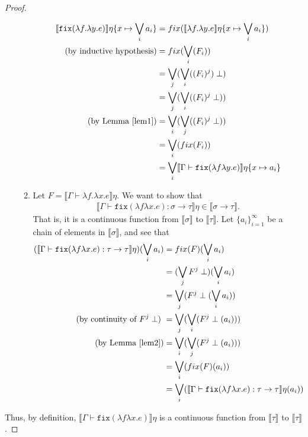\begin{proof}
\begin{itemize}
\begin{enumerate}
\begin{align*}
 \llbracket \texttt{fix} (\lambda f.\lambda y.e)\rrbracket\eta\{x\mapsto \bigvee_i a_i\} &= 
 fix(\llbracket \lambda f. \lambda y.e \rrbracket\eta\{x\mapsto \bigvee_i a_i\})\\
 \text{(by inductive hypothesis)} &= fix(\bigvee_i(F_i)) \\
 &= \bigvee_j(\bigvee_i((F_i)^j )\perp) \\
 &= \bigvee_j(\bigvee_i((F_i)^j \perp)) \\ 
\text{(by Lemma \ref{lem1})} &= \bigvee_i(\bigvee_j((F_i)^j \perp)) \\ 
&= \bigvee_i(fix(F_i))\\
&= \bigvee_i \llbracket \Gamma \vdash \texttt{fix}(\lambda f \lambda y.e)\rrbracket\eta\{x\mapsto a_i\}
 \end{align*}
 \item Let $F = \llbracket \Gamma \vdash \lambda f. \lambda x.e\rrbracket\eta$. We want to show that 
 \begin{align*}
 \llbracket\Gamma\vdash\texttt{fix}(\lambda f \lambda x.e) :  \sigma 
 \rightarrow\tau\rrbracket\eta \in \llbracket \sigma \rightarrow \tau \rrbracket.
 \end{align*}
 That is, it is a continuous function from 
 $\llbracket \sigma \rrbracket$ to $\llbracket \tau \rrbracket$. Let $\{a_i\}^{\infty}_{i=1}$ be a chain of elements in $\llbracket \sigma \rrbracket$,  and see that 
 \begin{align*}
 (\llbracket\Gamma\vdash\texttt{fix}(\lambda f \lambda x.e) : \tau \rightarrow\tau\rrbracket\eta)( \bigvee_i a_i) &= 
 fix(F)(\bigvee_i a_i)\\ 
 &=(\bigvee_j F^j \perp)(\bigvee_i a_i)\\
 &= \bigvee_j (F^j \perp(\bigvee_i a_i))\\ 
 \text{(by continuity of $F^j \perp$) }&= \bigvee_j(\bigvee_i(F^j \perp(a_i)))\\ 
 \text{(by Lemma \ref{lem2})} &=\bigvee_i(\bigvee_j(F^j \perp(a_i))) \\
 &= \bigvee_i(fix(F)(a_i))\\
 &= \bigvee_i(\llbracket\Gamma\vdash\texttt{fix}(\lambda f \lambda x.e) : \tau \rightarrow\tau\rrbracket\eta(a_i))
 \end{align*}
 \end{enumerate}
 \end{itemize}
 Thus, by definition, $\llbracket \Gamma \vdash \texttt{fix}(\lambda f \lambda x.e) \rrbracket\eta$ is a continuous function
 from $\llbracket \tau \rrbracket$ to $\llbracket \tau \rrbracket$.
 \end{proof}
